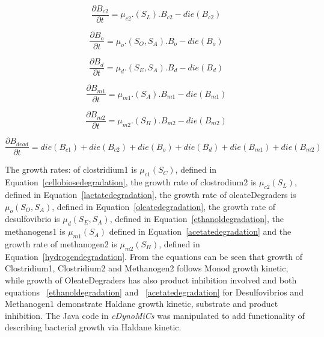 \begin{equation}
\frac{\partial B_{c2}}{\partial t} = \mu_{c2}.(S_{L}). B_{c2}-die(B_{c2})
\label{b2}
\end{equation}

\begin{equation}
\frac{\partial B_{o}}{\partial t} = \mu_{o}.(S_{O}, S_{A}). B_{o}-die(B_{o})
\label{b3}
\end{equation}

\begin{equation}
\frac{\partial B_{d}}{\partial t} = \mu_{d}.(S_{E}, S_{A}). B_{d}-die(B_{d})
\label{b4}
\end{equation}

\begin{equation}
\frac{\partial B_{m1}}{\partial t} = \mu_{m1}.(S_{A}). B_{m1}-die(B_{m1})
\label{b5}
\end{equation}

\begin{equation}
\frac{\partial B_{m2}}{\partial t} = \mu_{m2}.(S_{H}). B_{m2}-die(B_{m2})
\label{b6}
\end{equation}

\begin{equation}
\frac{\partial B_{dead}}{\partial t} = die(B_{c1}) + die(B_{c2}) + die(B_o) + die(B_d) + die(B_{m1}) + die(B_{m2})
\label{b7}
\end{equation}

The growth rates: of clostridium1 is $\mu_{c1}(S_{C})$, defined in Equation~\ref{cellobiosedegradation}, the growth rate of clostrodium2 is $\mu_{c2}(S_{L})$, defined in Equation~\ref{lactatedegradation}, the growth rate of oleateDegraders is $\mu_{o}(S_{O}, S_{A})$, defined in Equation~\ref{oleatedegradation}, the growth rate of desulfovibrio is $\mu_{d}(S_{E}, S_{A})$, defined in Equation~\ref{ethanoldegradation}, the 
methanogens1 is $\mu_{m1}(S_{A})$ defined in Equation~\ref{acetatedegradation} and the growth rate of methanogen2 is $\mu_{m2}(S_{H})$, defined in Equation~\ref{hydrogendegradation}.
From the equations can be seen that growth of Clostridium1, Clostridium2 and Methanogen2 follows Monod growth kinetic, while growth of OleateDegraders has also product inhibition involved and both equations ~\ref{ethanoldegradation} and ~\ref{acetatedegradation} for Desulfovibrios and Methanogen1 demonstrate Haldane growth kinetic, substrate and product inhibition. The Java code in \textsl{cDynoMiCs} was manipulated to add functionality of describing bacterial growth via Haldane kinetic. 

